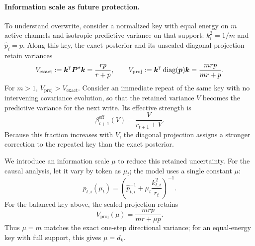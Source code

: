 \documentclass[11pt,letterpaper,logo]{yalearxiv}
\begin{document}
\paragraph{Information scale as future protection.}
To understand overwrite, consider a normalized key with equal energy on $m$ active channels and
isotropic predictive variance on that support: $k_i^2=1/m$ and $\widehat p_i=p$. Along this key,
the exact posterior and its unscaled diagonal projection retain variances
\begin{equation}
  V_{\mathrm{exact}}
  :=\boldsymbol{k}^{\intercal}\boldsymbol{P}^{\star}\boldsymbol{k}
  =\frac{rp}{r+p},
  \qquad
  V_{\mathrm{proj}}
  :=\boldsymbol{k}^{\intercal}\operatorname{diag}(\boldsymbol{p})\boldsymbol{k}
  =\frac{mrp}{mr+p}.
  \label{eq:appendix-balanced-key-mismatch}
\end{equation}
For $m>1$, $V_{\mathrm{proj}}>V_{\mathrm{exact}}$. Consider an immediate repeat of the same key
with no intervening covariance evolution, so that the retained variance $V$ becomes the predictive
variance for the next write. Its effective strength is
\begin{equation}
  \beta_{t+1}^{\mathrm{eff}}(V)
  =\frac{V}{r_{t+1}+V}.
  \label{eq:appendix-variance-write-link}
\end{equation}
Because this fraction increases with $V$, the diagonal projection assigns a stronger correction
to the repeated key than the exact posterior.

We introduce an information scale $\mu$ to reduce this retained uncertainty. For the causal
analysis, let it vary by token as $\mu_t$; the model uses a single constant $\mu$:
\begin{equation}
  p_{t,i}(\mu_t)
  =\left(\widehat p_{t,i}^{-1}
    +\mu_t\frac{k_{t,i}^2}{r_t}\right)^{-1}.
  \label{eq:appendix-protection-scale-update}
\end{equation}
For the balanced key above, the scaled projection retains
\begin{equation}
  V_{\mathrm{proj}}(\mu)=\frac{mrp}{mr+\mu p}.
  \label{eq:appendix-balanced-key-protection}
\end{equation}
Thus $\mu=m$ matches the exact one-step directional variance; for an equal-energy key with full
support, this gives $\mu=d_k$.
\end{document}
